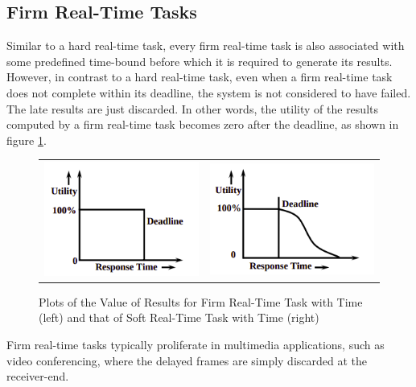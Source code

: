 \documentclass[12pt]{report}
\begin{document}
\subsection{Firm Real-Time Tasks}
Similar to a hard real-time task, every firm real-time task is also associated with some predefined time-bound before which it is required to generate its results. However, in contrast to a hard real-time task, even when a firm real-time task does not complete within its deadline, the system is not considered to have failed. The late results are just discarded. In other words, the utility of the results computed by a firm real-time task becomes zero after the deadline, as shown in figure \ref{fig:firm-and-soft-rts}. 

\begin{figure}[h]
\begin{tabular}{cc}
\includegraphics[scale=0.8]{images/firm-rts.png}
&
\includegraphics[scale=0.8]{images/soft-rts.png}
\end{tabular}
\caption[Plots of the Value of Results for Firm and Soft Real-Time Tasks]{Plots of the Value of Results for Firm Real-Time Task with Time (left) and that of Soft Real-Time Task with Time (right) \cite{NPTEL}}
\label{fig:firm-and-soft-rts}
\end{figure}

Firm real-time tasks typically proliferate in multimedia applications, such as video conferencing, where the delayed frames are simply discarded at the receiver-end. 
\end{document}

